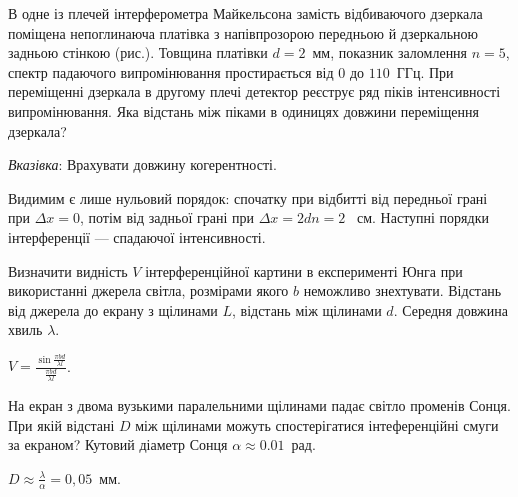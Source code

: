 \begin{problem}%
В одне із плечей інтерферометра Майкельсона замість відбиваючого
дзеркала поміщена непоглинаюча платівка з напівпрозорою передньою
й дзеркальною задньою стінкою (рис.). Товщина платівки $ d = 2 $~мм,
показник заломлення $ n = 5 $, спектр падаючого випромінювання
простирається від $ 0 $ до $ 110 $~ГГц. При переміщенні дзеркала в другому
плечі детектор реєструє ряд піків інтенсивності випромінювання. Яка
відстань між піками в одиницях довжини переміщення дзеркала?

\begin{center}
	
\end{center}

\emph{Вказівка}: Врахувати довжину когерентності.
\begin{solution}
	Видимим є лише нульовий порядок: спочатку при відбитті від передньої грані
	при $ \Delta x = 0 $, потім від задньої грані при $ \Delta  x = 2dn = 2 $~ см. Наступні порядки
	інтерференції --- спадаючої інтенсивності.
\end{solution}
\end{problem}



\begin{problem}\label{prb:V_ovch_5.1}%
Визначити видність $V$ інтерференційної картини в експерименті Юнга
при використанні джерела світла, розмірами якого $ b $ неможливо
знехтувати. Відстань від джерела до екрану з щілинами $ L $, відстань між
щілинами $ d $. Середня довжина хвиль $ \lambda $.
\begin{solution}
	$V = \frac{\sin\frac{\pi b d}{\lambda l}}{\frac{\pi b d}{\lambda l}}$.
\end{solution}
\end{problem}


\begin{problem}%
На екран з двома вузькими паралельними щілинами падає світло
променів Сонця. При якій відстані $ D $ між щілинами можуть
спостерігатися інтеференційні смуги за екраном? Кутовий діаметр
Сонця  $ \alpha \approx 0.01 $~рад.
\begin{solution}
	$D \approx \frac{\lambda}{\alpha} = 0,05$~мм.
\end{solution}
\end{problem}



